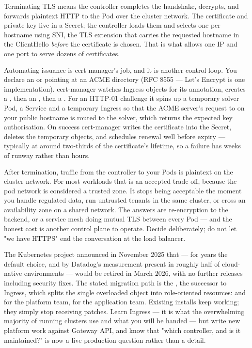  Terminating TLS means the controller completes the handshake, decrypts, and forwards plaintext HTTP to the Pod over the cluster network. The certificate and private key live in a  Secret; the controller loads them and selects one per hostname using SNI, the TLS extension that carries the requested hostname in the ClientHello \emph{before} the certificate is chosen. That is what allows one IP and one port to serve dozens of certificates.

Automating issuance is cert-manager's job, and it is another control loop. You declare an  or  pointing at an ACME directory (RFC 8555 --- Let's Encrypt is one implementation). cert-manager watches Ingress objects for its annotation, creates a , then an , then a . For an HTTP-01 challenge it spins up a temporary solver Pod, a Service and a temporary Ingress so that the ACME server's request to  on your public hostname is routed to the solver, which returns the expected key authorisation. On success cert-manager writes the certificate into the Secret, deletes the temporary objects, and schedules renewal well before expiry --- typically at around two-thirds of the certificate's lifetime, so a failure has weeks of runway rather than hours.

\begin{secwarn}
After termination, traffic from the controller to your Pods is plaintext on the cluster network. For most workloads that is an accepted trade-off, because the pod network is considered a trusted zone. It stops being acceptable the moment you handle regulated data, run untrusted tenants in the same cluster, or cross an availability zone on a shared network. The answers are re-encryption to the backend, or a service mesh doing mutual TLS between every Pod --- and the honest cost is another control plane to operate. Decide deliberately; do not let "we have HTTPS" end the conversation at the load balancer.
\end{secwarn}

\begin{opsnote}
The Kubernetes project announced in November 2025 that  --- for years the default choice, and by Datadog's measurement present in roughly half of cloud-native environments --- would be retired in March 2026, with no further releases including security fixes. The stated migration path is the , the successor to Ingress, which splits the single overloaded object into role-oriented resources:  and  for the platform team,  for the application team. Existing installs keep working; they simply stop receiving patches. Learn Ingress --- it is what the overwhelming majority of running clusters use and what you will be handed --- but write new platform work against Gateway API, and know that "which controller, and is it maintained?" is now a live production question rather than a detail.
\end{opsnote}

